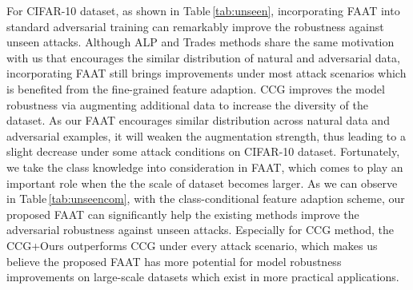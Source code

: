 \documentclass[10pt,twocolumn,letterpaper]{article}
\begin{document}
For CIFAR-10 dataset, as shown in Table\,\ref{tab:unseen}, incorporating FAAT into standard adversarial training can remarkably improve the robustness against unseen attacks. Although ALP and Trades methods share the same motivation with us that encourages the similar distribution of natural and adversarial data, incorporating FAAT still brings improvements under most attack scenarios which is benefited from the fine-grained feature adaption. CCG improves the model robustness via augmenting additional data to increase the diversity of the dataset. As our FAAT encourages similar distribution across natural data and adversarial examples, it will weaken the augmentation strength, thus leading to a slight decrease under some attack conditions on CIFAR-10 dataset. Fortunately, we take the class knowledge into consideration in FAAT, which comes to play an important role when the the scale of dataset becomes larger. As we can observe in Table\,\ref{tab:unseencom}, with the class-conditional feature adaption scheme, our proposed FAAT can significantly help the existing methods improve the adversarial robustness against unseen attacks. Especially for CCG method, the CCG+Ours outperforms CCG under every attack scenario, which makes us believe the proposed FAAT has more potential for model robustness improvements on large-scale datasets which exist in more practical applications.

\end{document}
